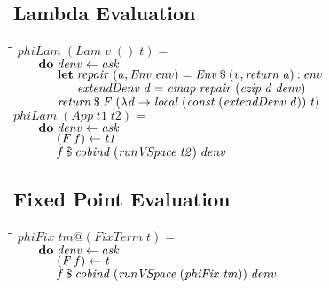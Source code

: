 \documentclass[10pt]{article}
\newlength{\lwidth}\setlength{\lwidth}{4.5cm}
\newlength{\cwidth}\setlength{\cwidth}{8mm} %
\newcommand{\Conid}[1]{\mathit{#1}}
\newcommand{\Varid}[1]{\mathit{#1}}
\begin{document}
\subsection{Lambda Evaluation}

\begin{tabbing}
\qquad\=\hspace{\lwidth}\=\hspace{\cwidth}\=\+\kill
${\Varid{phiLam}\;(\Conid{Lam}\;\Varid{v}\;()\;\Varid{t})\mathrel{=}}$\\
${\hskip2.00em\relax\mathbf{do}\;\Varid{denv}\leftarrow \Varid{ask}}$\\
${\hskip2.00em\relax\phantom{\mathbf{do}\;\mbox{}}\mathbf{let}\;\Varid{repair}\;(\Varid{a},\Conid{Env}\;\Varid{env})\mathrel{=}\Conid{Env}\mathbin{\$}(\Varid{v},\Varid{return}\;\Varid{a})\mathbin{:}\Varid{env}}$\\
${\hskip2.00em\relax\phantom{\mathbf{do}\;\mbox{}}\phantom{\mathbf{let}\;\mbox{}}\Varid{extendDenv}\;\Varid{d}\mathrel{=}\Varid{cmap}\;\Varid{repair}\;(\Varid{czip}\;\Varid{d}\;\Varid{denv})}$\\
${\hskip2.00em\relax\phantom{\mathbf{do}\;\mbox{}}\Varid{return}\mathbin{\$}\Conid{F}\;(\lambda \Varid{d}\to \Varid{local}\;(\Varid{const}\;(\Varid{extendDenv}\;\Varid{d}))\;\Varid{t})}$\\
${}$\\
${\Varid{phiLam}\;(\Conid{App}\;\Varid{t1}\;\Varid{t2})\mathrel{=}}$\\
${\hskip2.00em\relax\mathbf{do}\;\Varid{denv}\leftarrow \Varid{ask}}$\\
${\hskip2.00em\relax\phantom{\mathbf{do}\;\mbox{}}(\Conid{F}\;\Varid{f})\leftarrow \Varid{t1}}$\\
${\hskip2.00em\relax\phantom{\mathbf{do}\;\mbox{}}\Varid{f}\mathbin{\$}\Varid{cobind}\;(\Varid{runVSpace}\;\Varid{t2})\;\Varid{denv}}$
\end{tabbing}
\subsection{Fixed Point Evaluation}

\begin{tabbing}
\qquad\=\hspace{\lwidth}\=\hspace{\cwidth}\=\+\kill
${\Varid{phiFix}\;\Varid{tm}\mathord{@}(\Conid{FixTerm}\;\Varid{t})\mathrel{=}}$\\
${\hskip2.00em\relax\mathbf{do}\;\Varid{denv}\leftarrow \Varid{ask}}$\\
${\hskip2.00em\relax\phantom{\mathbf{do}\;\mbox{}}(\Conid{F}\;\Varid{f})\leftarrow \Varid{t}}$\\
${\hskip2.00em\relax\phantom{\mathbf{do}\;\mbox{}}\Varid{f}\mathbin{\$}\Varid{cobind}\;(\Varid{runVSpace}\;(\Varid{phiFix}\;\Varid{tm}))\;\Varid{denv}}$
\end{tabbing}
\end{document}
